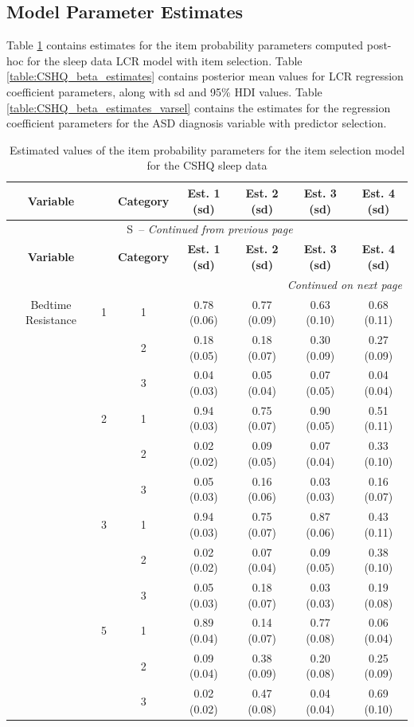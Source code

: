 \documentclass[11pt]{article}
\makeatletter
\renewcommand{\thetable}{S\@arabic\c@table}
\theoremstyle{plain}
\theoremstyle{definition}
\makeatother
\begin{document}
\subsection{Model Parameter Estimates}
Table \ref{table:CSHQ_item_prob_estimates_itemsel} contains estimates for the item probability parameters computed post-hoc for the sleep data LCR model with item selection. Table \ref{table:CSHQ_beta_estimates} contains posterior mean values for LCR regression coefficient parameters, along with sd and 95\% HDI values. Table \ref{table:CSHQ_beta_estimates_varsel} contains the estimates for the regression coefficient parameters for the ASD diagnosis variable with predictor selection.
\begin{longtable}{clccccc}
\caption{Estimated values of the item probability parameters for the item selection model for the CSHQ sleep data}
\label{table:CSHQ_item_prob_estimates_itemsel}\\
\toprule
\textbf{Variable} & & \textbf{Category}  & \textbf{Est. 1 (sd)}  & \textbf{Est. 2 (sd)}  & \textbf{Est. 3 (sd)} & \textbf{Est. 4 (sd)}  \\
\midrule
\endfirsthead

\multicolumn{7}{c}{\tablename\ \thetable\ -- \textit{Continued from previous page}} \\
\toprule
\textbf{Variable} & & \textbf{Category}  & \textbf{Est. 1 (sd)}  & \textbf{Est. 2 (sd)}  & \textbf{Est. 3 (sd)} & \textbf{Est. 4 (sd)}  \\
\midrule
\endhead

\midrule
\multicolumn{7}{r}{\textit{Continued on next page}} \\
\endfoot

\bottomrule
\endlastfoot
Bedtime Resistance &1 & 1  & 0.78 (0.06) & 0.77  (0.09) & 0.63 (0.10) & 0.68 (0.11)  \\
 & & 2  & 0.18 (0.05) & 0.18  (0.07) &  0.30 (0.09) & 0.27 (0.09)  \\
 & & 3  & 0.04 (0.03) &  0.05 (0.04) &  0.07 (0.05) & 0.04 (0.04) \\
&2 & 1  & 0.94 (0.03) &  0.75 (0.07) &  0.90 (0.05) & 0.51 (0.11)\\
 & & 2  & 0.02 (0.02) &  0.09 (0.05) &  0.07 (0.04) & 0.33 (0.10)\\
 & & 3  & 0.05 (0.03) &  0.16 (0.06) &  0.03 (0.03) & 0.16 (0.07)\\
&3 & 1  & 0.94 (0.03) &  0.75 (0.07) &  0.87 (0.06) & 0.43 (0.11)\\
&  & 2  & 0.02 (0.02) &  0.07 (0.04) &  0.09 (0.05) & 0.38 (0.10)\\
&  & 3  & 0.05 (0.03) &  0.18 (0.07) &  0.03 (0.03) & 0.19 (0.08)\\
 &5 & 1  & 0.89 (0.04) &  0.14 (0.07) &  0.77 (0.08) & 0.06 (0.04)\\
 & & 2  & 0.09 (0.04) &  0.38 (0.09) &  0.20 (0.08) & 0.25 (0.09)\\
&  & 3  & 0.02 (0.02) &  0.47 (0.08) &  0.04 (0.04) & 0.69 (0.10)\\


\end{longtable}
\end{document}
